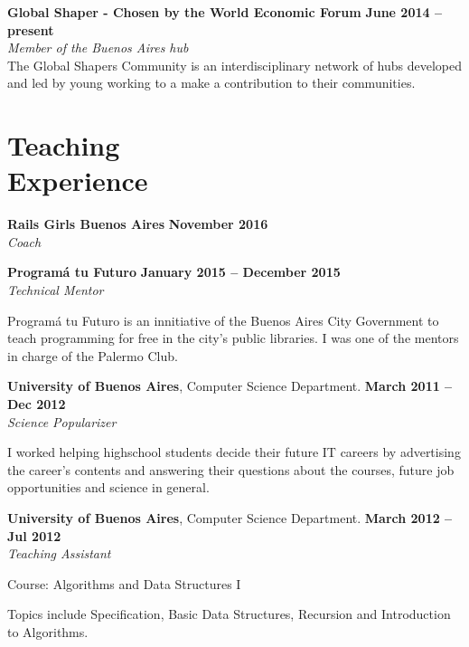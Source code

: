 \documentclass[margin,line]{resume}
\begin{document}
\begin{resume}
\textbf{Global Shaper - Chosen by the World Economic Forum} \hfill \textbf{June 2014 -- present} \vspace{2mm}\\\vspace{1mm}
\textsl{Member of the Buenos Aires hub} \\
The Global Shapers Community is an interdisciplinary network of hubs developed and led by young  working to a make a contribution to their communities.


\section{\mysidestyle Teaching\\Experience}


\textbf{Rails Girls Buenos Aires} \hfill \textbf{November 2016}
\\
\textsl{Coach} \hfill 


\textbf{Program\'a tu Futuro} \hfill \textbf{January 2015 --  December 2015}
\\
\textsl{Technical Mentor} \hfill 
\begin{list2}
	\item Program\'a tu Futuro is an innitiative of the Buenos Aires City Government to teach programming for free in the city's public libraries. I was one of the mentors in charge of the Palermo Club.
\end{list2}\vspace{-1.5mm}

\textbf{University of Buenos Aires}, Computer Science Department. \hfill \textbf{March 2011 --  Dec 2012}
\\
\textsl{Science Popularizer} \hfill 
\begin{list2}
	\item I worked helping highschool students decide their future IT careers by advertising the career's contents and answering their questions about the courses, future job opportunities and science in general. 
\end{list2}\vspace{-1.5mm}


\textbf{University of Buenos Aires}, Computer Science Department. \hfill \textbf{March 2012 --  Jul 2012}
\\
\textsl{Teaching Assistant} \hfill
\begin{list2}
	\item Course: Algorithms and Data Structures I
	\item Topics include Specification, Basic Data Structures, Recursion and Introduction to Algorithms.
\end{list2}\vspace{-1.5mm}


\end{resume}
\end{document}
